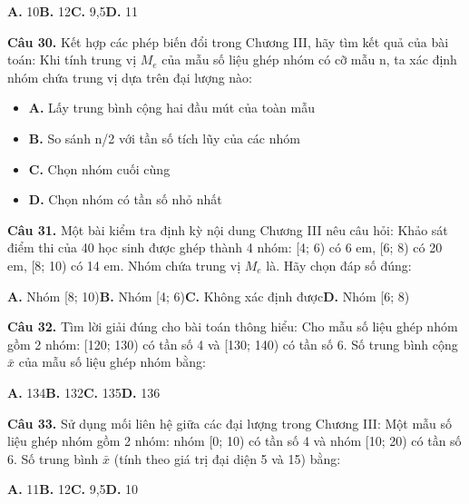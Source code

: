 \documentclass[11pt,a4paper]{article}
\begin{document}
\hspace*{1.5em}\textbf{A.} 10\quad\quad \textbf{B.} 12\quad\quad \textbf{C.} 9,5\quad\quad \textbf{D.} 11\par\vspace{2pt}
\textbf{\color{primary} Câu 30.} Kết hợp các phép biến đổi trong Chương III, hãy tìm kết quả của bài toán: Khi tính trung vị $M_e$ của mẫu số liệu ghép nhóm có cỡ mẫu n, ta xác định nhóm chứa trung vị dựa trên đại lượng nào:\par
\begin{itemize}\setlength{\itemsep}{1pt}\setlength{\parskip}{0pt}
  \item[] \textbf{A.} Lấy trung bình cộng hai đầu mút của toàn mẫu
  \item[] \textbf{B.} So sánh n/2 với tần số tích lũy của các nhóm
  \item[] \textbf{C.} Chọn nhóm cuối cùng
  \item[] \textbf{D.} Chọn nhóm có tần số nhỏ nhất
\end{itemize}\vspace{2pt}
\textbf{\color{primary} Câu 31.} Một bài kiểm tra định kỳ nội dung Chương III nêu câu hỏi: Khảo sát điểm thi của 40 học sinh được ghép thành 4 nhóm: [4; 6) có 6 em, [6; 8) có 20 em, [8; 10) có 14 em. Nhóm chứa trung vị $M_e$ là. Hãy chọn đáp số đúng:\par
\hspace*{1.5em}\textbf{A.} Nhóm [8; 10)\quad\quad \textbf{B.} Nhóm [4; 6)\quad\quad \textbf{C.} Không xác định được\quad\quad \textbf{D.} Nhóm [6; 8)\par\vspace{2pt}
\textbf{\color{primary} Câu 32.} Tìm lời giải đúng cho bài toán thông hiểu: Cho mẫu số liệu ghép nhóm gồm 2 nhóm: [120; 130) có tần số 4 và [130; 140) có tần số 6. Số trung bình cộng $\bar{x}$ của mẫu số liệu ghép nhóm bằng:\par
\hspace*{1.5em}\textbf{A.} 134\quad\quad \textbf{B.} 132\quad\quad \textbf{C.} 135\quad\quad \textbf{D.} 136\par\vspace{2pt}
\textbf{\color{primary} Câu 33.} Sử dụng mối liên hệ giữa các đại lượng trong Chương III: Một mẫu số liệu ghép nhóm gồm 2 nhóm: nhóm [0; 10) có tần số 4 và nhóm [10; 20) có tần số 6. Số trung bình $\bar{x}$ (tính theo giá trị đại diện 5 và 15) bằng:\par
\hspace*{1.5em}\textbf{A.} 11\quad\quad \textbf{B.} 12\quad\quad \textbf{C.} 9,5\quad\quad \textbf{D.} 10\par\vspace{2pt}
\end{document}
